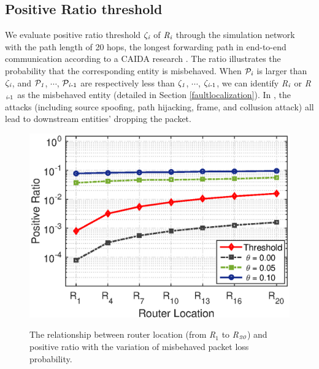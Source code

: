 \subsection{Positive Ratio threshold}
\label{positiveratiothreshold}
We evaluate positive ratio threshold $\zeta_\emph{i}$ of $\emph{R}_\emph{i}$ through the simulation network with the path length of 20 hops, the longest forwarding path in end-to-end communication according to a CAIDA research \cite{huffaker2002distance}. The ratio illustrates the probability that the corresponding entity is misbehaved. When $\mathcal{P}_\emph{i}$ is larger than $\zeta_\emph{i}$, and $\mathcal{P}_\emph{1}$, $\cdots$, $\mathcal{P}_{\emph{i-}1}$ are respectively less than $\zeta_\emph{1}$, $\cdots$, $\zeta_{\emph{i-}1}$, we can identify \emph{R}$_\emph{i}$ or \emph{R}$_{\emph{i-}1}$ as the misbehaved entity (detailed in Section \ref{faultlocalization}). In \name{}, the attacks (including source spoofing, path hijacking, frame, and collusion attack) all lead to downstream entities' dropping the packet. %
\iffalse
\begin{figure}%
  \centering
  \includegraphics[width=0.85\columnwidth]{code_matlab/positiveratio11.eps}\\
  \caption{The relationship between router location (from \emph{R}$_1$ to \emph{R}$_\emph{20}$) and positive ratio with the variation of misbehaved packet loss probability.}\label{positiveratio}
\end{figure}
